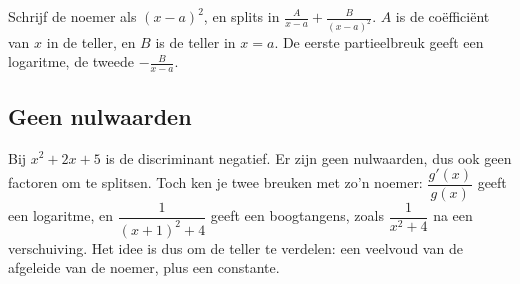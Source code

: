 \begin{werkwijze}
Schrijf de noemer als $(x - a)^2$, en splits in $\tfrac{A}{x - a} + \tfrac{B}{(x - a)^2}$. $A$ is de coëfficiënt van $x$ in de teller, en $B$ is de teller in $x = a$. De eerste partieelbreuk geeft een logaritme, de tweede $-\tfrac{B}{x - a}$.
\end{werkwijze}


\begin{oefeningen}
\end{oefeningen}

\subsection{Geen nulwaarden}

Bij $x^2 + 2x + 5$ is de discriminant negatief. Er zijn geen nulwaarden, dus ook geen factoren om te splitsen. Toch ken je twee breuken met zo'n noemer: $\dfrac{g'(x)}{g(x)}$ geeft een logaritme, en $\dfrac{1}{(x + 1)^2 + 4}$ geeft een boogtangens, zoals $\dfrac{1}{x^2 + 4}$ na een verschuiving. Het idee is dus om de teller te verdelen: een veelvoud van de afgeleide van de noemer, plus een constante.


